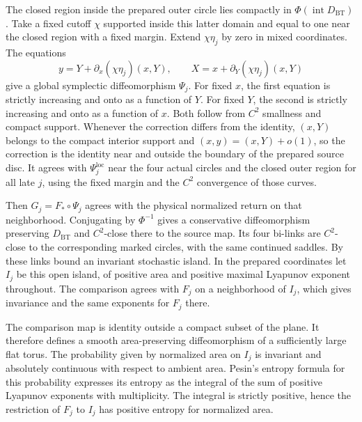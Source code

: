 \documentclass[11pt]{article}
\begin{document}
The closed region inside the prepared outer circle lies compactly in
\(\Phi(\operatorname{int}D_{\mathrm{BT}})\). Take a fixed cutoff \(\chi\)
supported inside this latter domain and equal to one near the closed region with
a fixed margin. Extend \(\chi\eta_j\) by zero in mixed coordinates. The
equations \[
 y=Y+\partial_x(\chi\eta_j)(x,Y),\qquad
 X=x+\partial_Y(\chi\eta_j)(x,Y)
\] give a global symplectic diffeomorphism \(\Psi_j\). For fixed \(x\), the
first equation is strictly increasing and onto as a function of \(Y\). For fixed
\(Y\), the second is strictly increasing and onto as a function of \(x\). Both
follow from \(C^2\) smallness and compact support. Whenever the correction
differs from the identity, \((x,Y)\) belongs to the compact interior support and
\((x,y)=(x,Y)+o(1)\), so the correction is the identity near and outside the
boundary of the prepared source disc. It agrees with \(\Psi_j^{\mathrm{loc}}\)
near the four actual circles and the closed outer region for all late \(j\),
using the fixed margin and the \(C^2\) convergence of those curves.

Then \(G_j=F_*\circ\Psi_j\) agrees with the physical normalized return on that
neighborhood. Conjugating by \(\Phi^{-1}\) gives a conservative diffeomorphism
preserving \(D_{\mathrm{BT}}\) and \(C^2\)-close there to the source map. Its
four bi-links are \(C^2\)-close to the corresponding marked circles, with the
same continued saddles. By \cite[Proposition 2.1 and Corollary E]{BT} these
links bound an invariant stochastic island. In the prepared coordinates let
\(I_j\) be this open island, of positive area and positive maximal Lyapunov
exponent throughout. The comparison agrees with \(F_j\) on a neighborhood of
\(I_j\), which gives invariance and the same exponents for \(F_j\) there.

The comparison map is identity outside a compact subset of the plane. It
therefore defines a smooth area-preserving diffeomorphism of a sufficiently
large flat torus. The probability given by normalized area on \(I_j\) is
invariant and absolutely continuous with respect to ambient area. Pesin's
entropy formula for this probability \cite{Mane} expresses its entropy as the
integral of the sum of positive Lyapunov exponents with multiplicity. The
integral is strictly positive, hence the restriction of \(F_j\) to \(I_j\) has
positive entropy for normalized area.
\end{document}
